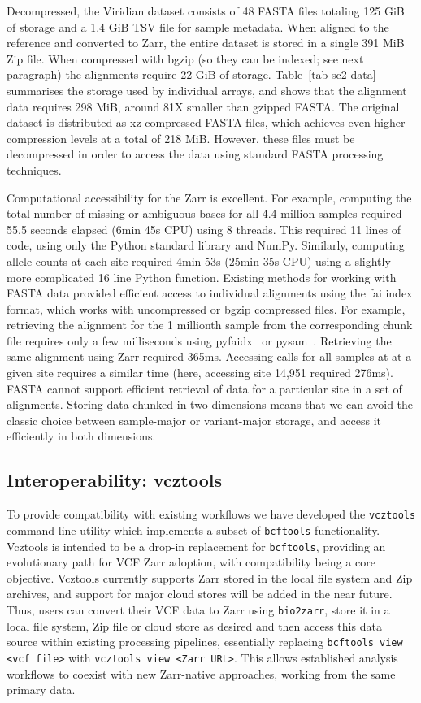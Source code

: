 \documentclass[a4paper,num-refs]{oup-contemporary}
\begin{document}
Decompressed, the Viridian dataset consists of 48
FASTA files totaling 125 GiB of storage and a 1.4 GiB
TSV file for sample metadata.
When aligned to the reference and converted to Zarr, the
entire dataset is stored in a single 391 MiB Zip file.
When compressed with bgzip (so they can be indexed; see next 
paragraph) the alignments require 22 GiB of storage.
Table~\ref{tab-sc2-data} summarises the storage used by individual
arrays, and shows that the alignment data requires 298 MiB,
around 81X smaller than gzipped FASTA.
The original dataset is distributed as xz compressed FASTA files, which
achieves even higher compression levels at a total of 218 MiB.
However, these files must be decompressed in order to access the data
using standard FASTA processing techniques.

Computational accessibility for the Zarr is excellent. For example,
computing the total number of missing or ambiguous bases for 
all 4.4 million samples required 55.5 seconds elapsed (6min 45s CPU)
using 8 threads. This required 11 lines of code, using only the 
Python standard library and NumPy. Similarly, computing allele
counts at each site required 4min 53s (25min 35s CPU) using a slightly
more complicated 16 line Python function.
Existing methods for working with FASTA data provided efficient 
access to individual alignments using the fai index format, which
works with uncompressed or bgzip compressed files.
For example, retrieving the alignment for the 1 millionth sample 
from the corresponding chunk file requires only a few milliseconds
using pyfaidx~\citep{shirley2015efficient} or 
pysam~\citep{pysam}. Retrieving the same alignment using Zarr 
required 365ms. 
Accessing calls for all samples at at a given 
site requires a similar time (here, accessing site 14,951
required 276ms). 
FASTA cannot support efficient retrieval
of data for a particular site in a set of alignments.
Storing data chunked in two dimensions means that we can avoid
the classic choice between sample-major or variant-major storage,
and access it efficiently in both dimensions.

\subsection{Interoperability: vcztools}
To provide compatibility with existing workflows we have
developed the \texttt{vcztools} command line utility which
implements a subset of \texttt{bcftools} functionality.
Vcztools is intended to be a drop-in replacement for \texttt{bcftools},
providing an evolutionary path for VCF Zarr adoption,
with compatibility being a core objective.
Vcztools currently supports Zarr stored in the local file system
and Zip archives, and support for major cloud stores will be added in the near future. 
Thus, users can convert their VCF data to Zarr using \texttt{bio2zarr},
store it in a local file system, Zip file or cloud store as desired
and then access this data source within existing processing pipelines,
essentially replacing \texttt{bcftools view <vcf file>} with
\texttt{vcztools view <Zarr URL>}.
This allows established analysis workflows to coexist with new Zarr-native
approaches, working from the same primary data.
\end{document}
